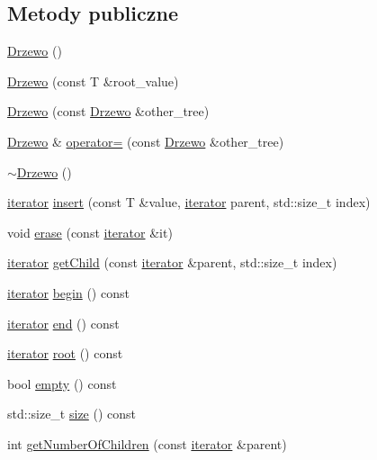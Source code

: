 \subsection*{Metody publiczne}
\begin{DoxyCompactItemize}
\item 
\hyperlink{class_drzewo_a9b87f8101458fea6c866ffd01efa9ef6}{Drzewo} ()
\item 
\hyperlink{class_drzewo_a18f9e596cec9dd18eed19f2b613a7c44}{Drzewo} (const T \&root\+\_\+value)
\item 
\hyperlink{class_drzewo_a337d26f83b35b414b729a147e8995c3e}{Drzewo} (const \hyperlink{class_drzewo}{Drzewo} \&other\+\_\+tree)
\item 
\hyperlink{class_drzewo}{Drzewo} \& \hyperlink{class_drzewo_a409545162097a3cfa6072717c3fd710f}{operator=} (const \hyperlink{class_drzewo}{Drzewo} \&other\+\_\+tree)
\item 
\hyperlink{class_drzewo_acbc76af50077660d8a75eaa4e086eac1}{$\sim$\+Drzewo} ()
\item 
\hyperlink{class_drzewo_1_1iterator}{iterator} \hyperlink{class_drzewo_a3d00b2880e12a416ab749c84ff879a70}{insert} (const T \&value, \hyperlink{class_drzewo_1_1iterator}{iterator} parent, std\+::size\+\_\+t index)
\item 
void \hyperlink{class_drzewo_a338ae0e9b48ee6d513b9f99c81da3d4b}{erase} (const \hyperlink{class_drzewo_1_1iterator}{iterator} \&it)
\item 
\hyperlink{class_drzewo_1_1iterator}{iterator} \hyperlink{class_drzewo_ae45271ae9e1b1071d56c87df7eb37cad}{get\+Child} (const \hyperlink{class_drzewo_1_1iterator}{iterator} \&parent, std\+::size\+\_\+t index)
\item 
\hyperlink{class_drzewo_1_1iterator}{iterator} \hyperlink{class_drzewo_a2f6661025ebf9a3f6c2df1726a0d46ca}{begin} () const
\item 
\hyperlink{class_drzewo_1_1iterator}{iterator} \hyperlink{class_drzewo_aea36f65c42299dd029a38fbf9ed346fb}{end} () const
\item 
\hyperlink{class_drzewo_1_1iterator}{iterator} \hyperlink{class_drzewo_a86f9dd2d9c43b63476cedc0bd14ee878}{root} () const
\item 
bool \hyperlink{class_drzewo_af02b0705726b31926a1a3e0b8bbef233}{empty} () const
\item 
std\+::size\+\_\+t \hyperlink{class_drzewo_a778ee17b16674b9d0577d22f5d55fa04}{size} () const
\item 
int \hyperlink{class_drzewo_a0f5f70f7dfe35ffce3bb5ba3ac23657b}{get\+Number\+Of\+Children} (const \hyperlink{class_drzewo_1_1iterator}{iterator} \&parent)
\end{DoxyCompactItemize}


